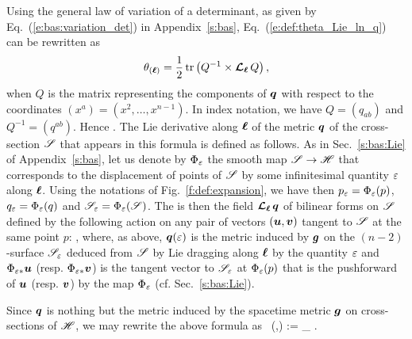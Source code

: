 Using the general law of variation of a determinant, as given by Eq.~(\ref{e:bas:variation_det})
in Appendix~\ref{s:bas}, Eq.~(\ref{e:def:theta_Lie_ln_q}) can be rewritten as
\[
    \theta_{(\bm{\ell})} = \frac{1}{2} \, \mathrm{tr} \left(Q^{-1} \times \bm{\mathcal{L}}_{\bm{\ell}}\, Q \right) ,
\]
when $Q$ is the matrix representing the components of $\bm{q}$ with respect to the
coordinates $(x^a) = (x^2,\ldots, x^{n-1})$. In index notation, we have
$Q = (q_{ab})$ and $Q^{-1} = (q^{ab})$. Hence
\be \label{e:def:theta_q_ab}
     .
\ee
The Lie derivative along $\bm{\ell}$ of the metric $\bm{q}$ of the cross-section
$\mathscr{S}$ that appears in this formula is defined as follows. As in Sec.~\ref{s:bas:Lie}
of Appendix~\ref{s:bas}, let us denote by $\Phi_\varepsilon$ the smooth map
$\mathscr{S} \to \mathscr{H}$ that corresponds to the displacement of points of $\mathscr{S}$ by
some infinitesimal quantity $\varepsilon$ along $\bm{\ell}$. Using the notations
of Fig.~\ref{f:def:expansion}, we have then $p_\varepsilon = \Phi_\varepsilon(p)$,
$q_\varepsilon = \Phi_\varepsilon(q)$ and $\mathscr{S}_\varepsilon = \Phi_\varepsilon(\mathscr{S})$. The  is then the field $\bm{\mathcal{L}}_{\bm{\ell}}\, \bm{q}$
of bilinear forms on $\mathscr{S}$ defined by the following action on any pair of vectors $(\bm{u},\bm{v})$
tangent to $\mathscr{S}$ at the same point $p$:
\be \label{e:def:def_Lie_ell_q}
   ,
\ee
where, as above, $\bm{q}(\varepsilon)$ is the metric induced by $\bm{g}$ on the $(n-2)$-surface
$\mathscr{S}_\varepsilon$ deduced from $\mathscr{S}$ by Lie dragging along $\bm{\ell}$ by the quantity $\varepsilon$
and
$\Phi_{\varepsilon*} \bm{u}$ (resp. $\Phi_{\varepsilon*} \bm{v}$) is the tangent vector to $\mathscr{S}_\varepsilon$
at $\Phi_\varepsilon(p)$ that is the pushforward of $\bm{u}$ (resp. $\bm{v}$) by the map $\Phi_\varepsilon$
(cf. Sec.~\ref{s:bas:Lie}).

\begin{remark}
Since $\bm{q}$ is nothing but the metric induced by the spacetime metric $\bm{g}$
on cross-sections of $\mathscr{H}$, we may rewrite the above formula as
\be
     \Lie{\el} \, (,) := \lim_{\veps{}} 
     .
\ee
\end{remark}


